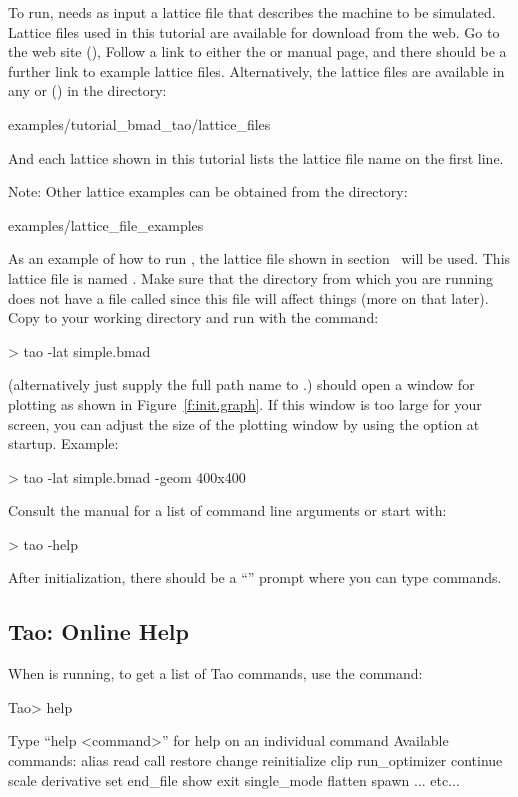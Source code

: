 \documentclass{hitec}     %
\begin{document}
To run, \tao needs as input a \bmad lattice file that describes the machine to be simulated.
Lattice files used in this tutorial are available for download from the web. Go to the \bmad web
site (), Follow a link to either the \bmad or \tao manual page, and there should
be a further link to example lattice files. Alternatively, the lattice files are available in any
 or  () in the directory:
\begin{code}
examples/tutorial_bmad_tao/lattice_files
\end{code}
And each lattice shown in this tutorial lists the lattice file name on the first line.

Note: Other lattice examples can be obtained from the directory:
\begin{code}
examples/lattice_file_examples
\end{code}

As an example of how to run \tao, the lattice file shown in section~ will be
used. This lattice file is named .  Make sure that the directory from which you are
running \tao does not have a file called  since this file will affect things (more on
that later). Copy  to your working directory and run \tao with the command:
\begin{code}
> tao -lat simple.bmad
\end{code}
(alternatively just supply the full path name to .)  \tao should open a window for
plotting as shown in Figure~\ref{f:init.graph}. If this window is too large for your screen, you can
adjust the size of the plotting window by using the  option at startup. Example:
\begin{code}
> tao -lat simple.bmad -geom 400x400
\end{code}
Consult the \tao manual for a list of command line arguments or start \tao with:
\begin{code}
> tao -help
\end{code}

After initialization, there should be a ``'' prompt where you can type \tao commands.

\subsection{Tao: Online Help}

When \tao is running, to get a list of Tao commands, use the  command:
\begin{code}
Tao> help

Type ``help <command>'' for help on an individual command
Available commands:
  alias                             read
  call                              restore
  change                            reinitialize
  clip                              run_optimizer
  continue                          scale
  derivative                        set
  end_file                          show
  exit                              single_mode
  flatten                           spawn
... etc...
\end{code}
\end{document}
